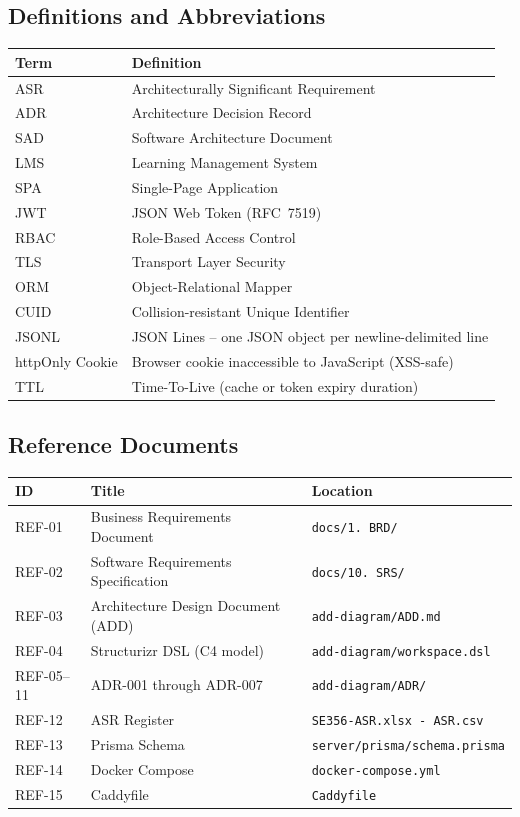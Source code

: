 \documentclass[12pt,a4paper]{article}
\begin{document}
\subsection{Definitions and Abbreviations}

\begin{tabularx}{\textwidth}{L{3cm} L{10.5cm}}
  \toprule
  \textbf{Term} & \textbf{Definition} \\
  \midrule
  ASR     & Architecturally Significant Requirement \\
  ADR     & Architecture Decision Record \\
  SAD     & Software Architecture Document \\
  LMS     & Learning Management System \\
  SPA     & Single-Page Application \\
  JWT     & JSON Web Token (RFC~7519) \\
  RBAC    & Role-Based Access Control \\
  TLS     & Transport Layer Security \\
  ORM     & Object-Relational Mapper \\
  CUID    & Collision-resistant Unique Identifier \\
  JSONL   & JSON Lines -- one JSON object per newline-delimited line \\
  httpOnly Cookie & Browser cookie inaccessible to JavaScript (XSS-safe) \\
  TTL     & Time-To-Live (cache or token expiry duration) \\
  \bottomrule
\end{tabularx}

\subsection{Reference Documents}

\begin{tabularx}{\textwidth}{C{1.5cm} L{4.5cm} L{7.5cm}}
  \toprule
  \textbf{ID} & \textbf{Title} & \textbf{Location} \\
  \midrule
  REF-01 & Business Requirements Document   & \texttt{docs/1.\ BRD/} \\
  REF-02 & Software Requirements Specification & \texttt{docs/10.\ SRS/} \\
  REF-03 & Architecture Design Document (ADD) & \texttt{add-diagram/ADD.md} \\
  REF-04 & Structurizr DSL (C4 model)        & \texttt{add-diagram/workspace.dsl} \\
  REF-05--11 & ADR-001 through ADR-007       & \texttt{add-diagram/ADR/} \\
  REF-12 & ASR Register                      & \texttt{SE356-ASR.xlsx - ASR.csv} \\
  REF-13 & Prisma Schema                     & \texttt{server/prisma/schema.prisma} \\
  REF-14 & Docker Compose                    & \texttt{docker-compose.yml} \\
  REF-15 & Caddyfile                         & \texttt{Caddyfile} \\
  \bottomrule
\end{tabularx}
\end{document}

